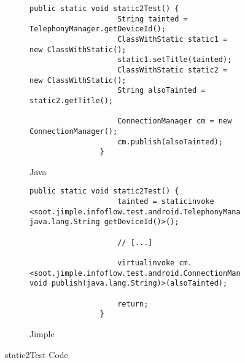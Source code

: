 \documentclass[../draft.tex]{subfiles}
\begin{document}
    \begin{figure}
        \centering
        \begin{subfigure}[b]{\textwidth}
            \begin{lstlisting}[gobble=12]
                public static void static2Test() {
                    String tainted = TelephonyManager.getDeviceId();
                    ClassWithStatic static1 = new ClassWithStatic();
                    static1.setTitle(tainted);
                    ClassWithStatic static2 = new ClassWithStatic();
                    String alsoTainted = static2.getTitle();
                    
                    ConnectionManager cm = new ConnectionManager();
                    cm.publish(alsoTainted);
                }
            \end{lstlisting}
            \caption{Java}
        \end{subfigure}
        \qquad
        \begin{subfigure}[b]{\textwidth}
            \begin{lstlisting}[language=Jimple]
                public static void static2Test() {
                    tainted = staticinvoke <soot.jimple.infoflow.test.android.TelephonyManager: java.lang.String getDeviceId()>();

                    // [...]
            
                    virtualinvoke cm.<soot.jimple.infoflow.test.android.ConnectionManager: void publish(java.lang.String)>(alsoTainted);

                    return;
                }
            \end{lstlisting}
            \caption{Jimple}
        \end{subfigure}
        \caption{static2Test Code}
        \label{lst:static2TestJava}
    \end{figure}

    
\end{document}

